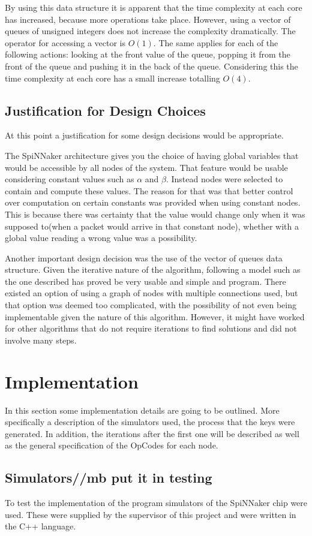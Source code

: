 \documentclass[12pt,a4paper]{article}
\begin{document}
By using this data structure it is apparent that the time complexity at each core has increased, because more operations take place. However, using a vector of queues of unsigned integers does not increase the complexity dramatically. The operator for accessing a vector is $O(1)$. The same applies for each of the following actions: looking at the front value of the queue, popping it from the front of the queue and pushing it in the back of the queue. Considering this the time complexity at each core has a small increase totalling $O(4)$.
\subsection{Justification for Design Choices}
At this point a justification for some design decisions would be appropriate. 

The SpiNNaker architecture gives you the choice of having global variables that would be accessible by all nodes of the system. That feature would be usable considering constant values such as $\alpha$ and $\beta$. Instead nodes were selected to contain and compute these values. The reason for that was that better control over computation on certain constants was provided when using constant nodes. This is because there was certainty that the value would change only when it was supposed to(when a packet would arrive in that constant node), whether with a global value reading a wrong value was a possibility.

Another important design decision was the use of the vector of queues data structure. Given the iterative nature of the algorithm, following a model such as the one described has proved be very usable and simple and program. There existed an option of using a graph of nodes with multiple connections used, but that option was deemed too complicated, with the possibility of not even being implementable given the nature of this algorithm. However, it might have worked for other algorithms that do not require iterations to find solutions and did not involve many steps.
\section{Implementation}
In this section some implementation details are going to be outlined. More specifically a description of the simulators used, the process that the keys were generated. In addition, the iterations after the first one will be described as well as the general specification of the OpCodes for each node.
\subsection{Simulators//mb put it in testing}
To test the implementation of the program simulators of the SpiNNaker chip were used. These were supplied by the supervisor of this project and were written in the C++ language. 
\end{document}

